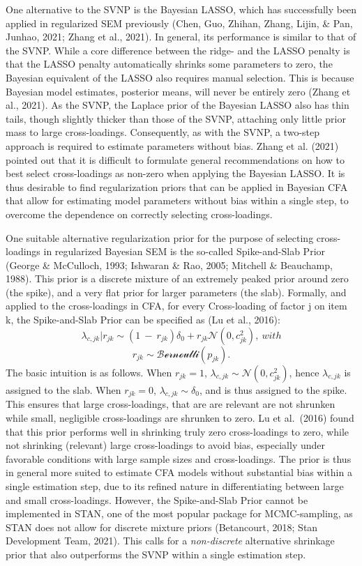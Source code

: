 \documentclass[
  man, donotrepeattitle,floatsintext]{apa6}
\begin{document}
One alternative to the SVNP is the Bayesian LASSO, which has successfully been applied in regularized SEM previously (Chen, Guo, Zhihan, Zhang, Lijin, \& Pan, Junhao, 2021; Zhang et al., 2021). In general, its performance is similar to that of the SVNP. While a core difference between the ridge- and the LASSO penalty is that the LASSO penalty automatically shrinks some parameters to zero, the Bayesian equivalent of the LASSO also requires manual selection. This is because Bayesian model estimates, posterior means, will never be entirely zero (Zhang et al., 2021). As the SVNP, the Laplace prior of the Bayesian LASSO also has thin tails, though slightly thicker than those of the SVNP, attaching only little prior mass to large cross-loadings. Consequently, as with the SVNP, a two-step approach is required to estimate parameters without bias. Zhang et al. (2021) pointed out that it is difficult to formulate general recommendations on how to best select cross-loadings as non-zero when applying the Bayesian LASSO. It is thus desirable to find regularization priors that can be applied in Bayesian CFA that allow for estimating model parameters without bias within a single step, to overcome the dependence on correctly selecting cross-loadings.

One suitable alternative regularization prior for the purpose of selecting cross-loadings in
regularized Bayesian SEM is the so-called Spike-and-Slab Prior (George \& McCulloch, 1993; Ishwaran \& Rao, 2005; Mitchell \& Beauchamp, 1988). This prior is a discrete mixture of an extremely peaked prior around zero (the spike), and a very flat prior for larger parameters (the slab). Formally, and applied to the cross-loadings in CFA, for every Cross-loading of factor j
on item k, the Spike-and-Slab Prior can be specified as (Lu et al., 2016):
\[\lambda_{c,jk} |r_{jk} \sim (1 \ - \ r_{jk})\delta_0 + r_{jk} \mathcal{N}(0, c^2_{jk}) , \ with\]
\[r_{jk} \sim \mathcal{Bernoulli}(p_{jk}).\]
The basic intuition is as follows. When \(r_{jk} = 1\), \(\lambda_{c,jk} \sim \mathcal{N}(0, c^2_{jk})\), hence \(\lambda_{c,jk}\) is assigned to the slab. When \(r_{jk} = 0\), \(\lambda_{c,jk} \sim \delta_0\), and is thus assigned to the spike. This ensures that large cross-loadings, that are are relevant are not shrunken while small, negligible cross-loadings are shrunken to zero. Lu et al.~(2016) found that this prior performs well in shrinking truly zero cross-loadings to zero, while not shrinking (relevant) large cross-loadings to avoid bias, especially under favorable conditions with large sample sizes and cross-loadings. The prior is thus in general more suited to estimate CFA models without substantial bias within a single estimation step, due to its refined nature in differentiating between large and small cross-loadings. However, the Spike-and-Slab Prior cannot be implemented in STAN, one of the most popular package for MCMC-sampling, as STAN does not allow for discrete mixture priors (Betancourt, 2018; Stan Development Team, 2021). This calls for a \emph{non-discrete} alternative shrinkage prior that also outperforms the SVNP within a single estimation step.
\end{document}
